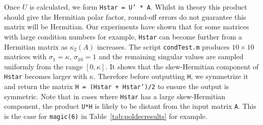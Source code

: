 \documentclass[10pt, A4paper]{article}
\begin{document}
Once $U$ is calculated, we form \texttt{Hstar = U' * A}.
Whilst in theory this product should give the Hermitian polar factor, 
round-off errors do not guarantee this matrix will be Hermitian.
Our experiments have shown that for some matrices with large condition 
numbers for example, \texttt{Hstar} can become further from a 
Hermitian matrix as $\kappa_2(A)$ increases.
The script \texttt{condTest.m} produces $10 
\times 10$ matrices with $\sigma_1 = \kappa$, $\sigma_{10} = 1$ and 
the remaining singular values are sampled uniformly from the range $[0, 
\kappa]$. It shows that the skew-Hermitian component of \texttt{Hstar} 
becomes larger with $\kappa$.
Therefore before outputting \texttt{H}, we symmetrize it and return the 
matrix \texttt{H = (Hstar + Hstar')/2} to ensure the output is 
symmetric. 
Note that in cases where \texttt{Hstar} has a large skew-Hermitian 
component, the product \texttt{U*H} is likely to be distant from the 
input matrix \texttt{A}. This is the case for \texttt{magic(6)} in 
Table~\ref{tab:poldecresults} for example.
\end{document}
